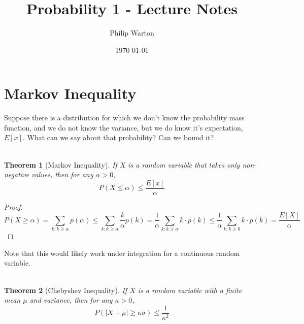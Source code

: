 \documentclass{article}
\newtheorem{theorem}{Theorem}[section]
\theoremstyle{definition}
\begin{document}
\title{Probability 1 - Lecture Notes}
\author{Philip Warton}
\date{\today}
\maketitle
\section{Markov Inequality}
    Suppose there is a distribution for which we don't know the probability mass function, and we do not know the variance, but we do know it's expectation, $E[x]$.
    What can we say about that probability?
    Can we bound it? \\\\
    \begin{mdframed}
        \begin{theorem}[Markov Inequality]
            If $X$ is a random variable that takes only non-negative values, then for any $\alpha > 0$,
            \[
                P(X \leq \alpha) \leqslant \frac{E[x]}{\alpha}
            \]
        \end{theorem}
    \end{mdframed}
    \begin{proof}
    \[
    P(X \geq \alpha) = \sum_{k : k \geq \alpha} p(\alpha) \leq \sum_{k : k \geq \alpha}\frac{k}{\alpha}p(k) = \frac{1}{\alpha}\sum_{k : k \geq \alpha}k\cdot p(k) \leq \frac{1}{\alpha} \sum_{k : k \geq 0}k \cdot p(k) = \frac{E[X]}{\alpha}
    \]
    \end{proof}
    Note that this would likely work under integration for a continuous random variable.\\\\
    \begin{mdframed}
        \begin{theorem}[Chebyshev Inequality]
            If $X$ is a random variable with a finite mean $\mu$ and variance, then for any $\kappa > 0$,
        \[
            P(|X- \mu | \geq \kappa \sigma) \leq \frac{1}{\kappa^2}
        \]
        \end{theorem}
    \end{mdframed}
\end{document}
